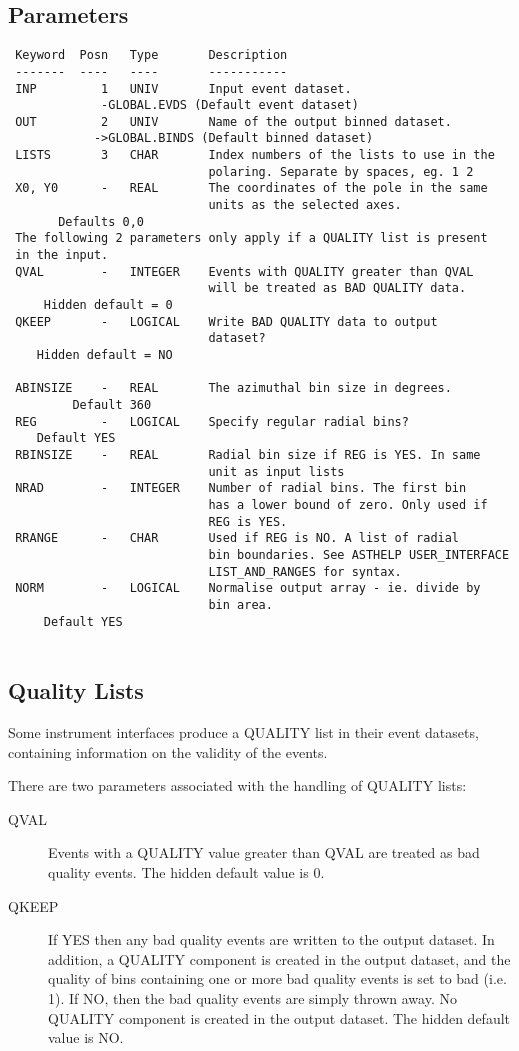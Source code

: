 \documentclass{book}
\renewcommand{\_}{{\tt\char'137}}     %
\begin{document}
\subsection{Parameters}
\begin{verbatim}
 Keyword  Posn   Type       Description
 -------  ----   ----       -----------
 INP         1   UNIV       Input event dataset.
             -GLOBAL.EVDS (Default event dataset)
 OUT         2   UNIV       Name of the output binned dataset.
            ->GLOBAL.BINDS (Default binned dataset)
 LISTS       3   CHAR       Index numbers of the lists to use in the
                            polaring. Separate by spaces, eg. 1 2
 X0, Y0      -   REAL       The coordinates of the pole in the same
                            units as the selected axes.
       Defaults 0,0
 The following 2 parameters only apply if a QUALITY list is present
 in the input.
 QVAL        -   INTEGER    Events with QUALITY greater than QVAL
                            will be treated as BAD QUALITY data.
     Hidden default = 0
 QKEEP       -   LOGICAL    Write BAD QUALITY data to output
                            dataset?
    Hidden default = NO
 
 ABINSIZE    -   REAL       The azimuthal bin size in degrees.
         Default 360
 REG         -   LOGICAL    Specify regular radial bins?
    Default YES
 RBINSIZE    -   REAL       Radial bin size if REG is YES. In same
                            unit as input lists
 NRAD        -   INTEGER    Number of radial bins. The first bin
                            has a lower bound of zero. Only used if
                            REG is YES.
 RRANGE      -   CHAR       Used if REG is NO. A list of radial
                            bin boundaries. See ASTHELP USER_INTERFACE
                            LIST_AND_RANGES for syntax.
 NORM        -   LOGICAL    Normalise output array - ie. divide by
                            bin area.
     Default YES
 
\end{verbatim}\subsection{Quality Lists}
Some instrument interfaces produce a QUALITY list in their event
datasets, containing information on the validity of the events.
 
There are two parameters associated with the handling of QUALITY
lists:
 
 
\begin{description}
\item[QVAL]
Events with a QUALITY value greater than QVAL are
treated as bad quality events. The hidden default
value is 0.
\item[QKEEP]
If YES then any bad quality events are written to the
output dataset. In addition, a QUALITY component is
created in the output dataset, and the quality of bins
containing one or more bad quality events is set to
bad (i.e. 1).
If NO, then the bad quality events are simply
thrown away. No QUALITY component is created in the
output dataset.
The hidden default value is NO.
\end{description}
\end{document}
